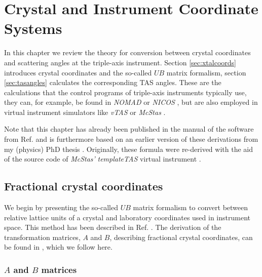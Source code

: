 %
%

\chapter{Crystal and Instrument Coordinate Systems}
\label{ch:xtal}

In this chapter we review the theory for conversion between crystal coordinates and scattering angles 
at the triple-axis instrument. Section \ref{sec:xtalcoords} introduces crystal coordinates and the so-called 
$UB$ matrix formalism, section \ref{sec:tasangles} calculates the corresponding TAS angles. 
These are the calculations that the control programs of triple-axis instruments typically use, they
can, for example, be found in \textit{NOMAD} \cite{web_NOMAD} or \textit{NICOS} \cite{web_NICOS},
but are also employed in virtual instrument simulators like \textit{vTAS} \cite{vTAS2013} or 
\textit{McStas} \cite{McStas2020}.

Note that this chapter has already been published in the manual of the software from Ref. \cite{Takin2021}
and is furthermore based on an earlier version of these derivations from my (physics) PhD thesis 
\cite[pp. 139-143]{PhDWeber}. Originally, these formula were re-derived with the aid of the source
code of \textit{McStas'} \textit{templateTAS} virtual instrument \cite{web_mcstas_templateTAS, McStas2020}.


\section{Fractional crystal coordinates \label{sec:xtalcoords}}

We begin by presenting the so-called $UB$ matrix formalism to convert between relative lattice units 
of a crystal and laboratory coordinates used in instrument space. This method has been described in 
Ref. \cite{Lumsden2005}. The derivation of the transformation matrices, $A$ and $B$, describing fractional
crystal coordinates, can be found in \cite{wiki_fractional}, which we follow here.

\subsection{$A$ and $B$ matrices}
